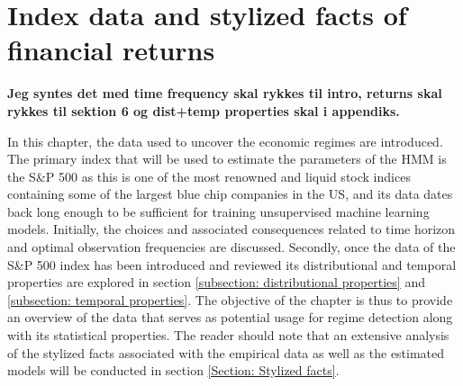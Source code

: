 \newpage
\section{Index data and stylized facts of financial returns}
\label{section: Data}

\textbf{Jeg syntes det med time frequency skal rykkes til intro, returns skal rykkes til sektion 6 og dist+temp properties skal i appendiks.}

In this chapter, the data used to uncover the economic regimes are introduced. The primary index that will be used to estimate the parameters of the HMM is the S\&P 500 as this is one of the most renowned and liquid stock indices containing some of the largest blue chip companies in the US, and its data dates back long enough to be sufficient for training unsupervised machine learning models. Initially, the choices and associated consequences related to time horizon and optimal observation frequencies are discussed. Secondly, once the data of the S\&P 500 index has been introduced and reviewed its distributional and temporal properties are explored in section \ref{subsection: distributional properties} and \ref{subsection: temporal properties}. The objective of the chapter is thus to provide an overview of the data that serves as potential usage for regime detection along with its statistical properties. The reader should note that an extensive analysis of the stylized facts associated with the empirical data as well as the estimated models will be conducted in section \ref{Section: Stylized facts}.  



